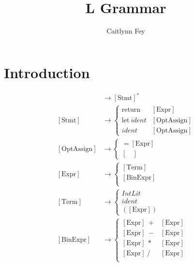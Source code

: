 \documentclass{article}
\title{L Grammar}
\author{Caitlynn Fey}
\begin{document}
	\maketitle
	\section{Introduction}
	\begin{align*} 
		[\text{Prog}] &\to  [\text{Stmt}]^* \\ 
		[\text{Stmt}] &\to  
		\begin{cases}
			\text{return} \ &[\text{Expr}] \\
			\text{let} \ \textit{ident} &[\text{OptAssign}] \\
			\textit{ident} &[\text{OptAssign}]
		\end{cases} \\
		[\text{OptAssign}] &\to
		\begin{cases}
			= [\text{Expr}]\\
			[\quad]
		\end{cases} \\
		[\text{Expr}]	&\to 
		\begin{cases}
			[\text{Term}] \\
			[\text{BinExpr}] \\
		\end{cases} \\	
		[\text{Term}]	&\to 
		\begin{cases}
			\textit{IntLit} \\
			\textit{ident} \\
			([\text{Expr}])
		\end{cases} \\	
		[\text{BinExpr}]	&\to 
		\begin{cases}
			[\text{Expr}]\ + &[\text{Expr}] \\
			[\text{Expr}]\ - &[\text{Expr}] \\
			[\text{Expr}]\ * &[\text{Expr}] \\
			[\text{Expr}]\ / &[\text{Expr}] \\
		\end{cases}
	\end{align*}
\end{document}
